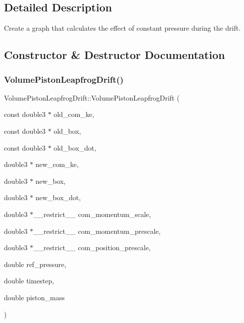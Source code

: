 \subsection{Detailed Description}
Create a graph that calculates the effect of constant pressure during the drift. 

\subsection{Constructor \& Destructor Documentation}
\hypertarget{classVolumePistonLeapfrogDrift_a3872d09e073ce1b58d0a70beab29e487}{}\label{classVolumePistonLeapfrogDrift_a3872d09e073ce1b58d0a70beab29e487} 
\subsubsection{\texorpdfstring{Volume\+Piston\+Leapfrog\+Drift()}{VolumePistonLeapfrogDrift()}}
{\footnotesize\ttfamily Volume\+Piston\+Leapfrog\+Drift\+::\+Volume\+Piston\+Leapfrog\+Drift (\begin{DoxyParamCaption}\item[{const double3 $\ast$}]{old\+\_\+com\+\_\+ke,  }\item[{const double3 $\ast$}]{old\+\_\+box,  }\item[{const double3 $\ast$}]{old\+\_\+box\+\_\+dot,  }\item[{double3 $\ast$}]{new\+\_\+com\+\_\+ke,  }\item[{double3 $\ast$}]{new\+\_\+box,  }\item[{double3 $\ast$}]{new\+\_\+box\+\_\+dot,  }\item[{double3 $\ast$\+\_\+\+\_\+restrict\+\_\+\+\_\+}]{com\+\_\+momentum\+\_\+scale,  }\item[{double3 $\ast$\+\_\+\+\_\+restrict\+\_\+\+\_\+}]{com\+\_\+momentum\+\_\+prescale,  }\item[{double3 $\ast$\+\_\+\+\_\+restrict\+\_\+\+\_\+}]{com\+\_\+position\+\_\+prescale,  }\item[{double}]{ref\+\_\+pressure,  }\item[{double}]{timestep,  }\item[{double}]{piston\+\_\+mass }\end{DoxyParamCaption})}



